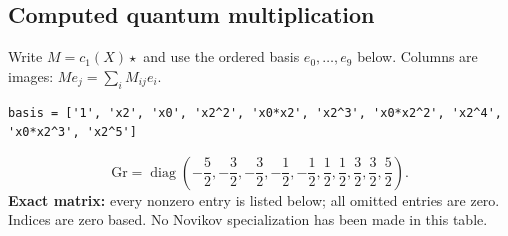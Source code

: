 \documentclass[10pt,a4paper]{article}
\begin{document}
\subsection*{Computed quantum multiplication}
Write $M=c_1(X)\star$ and use the ordered basis $e_0,\ldots,e_{9}$ below. Columns are images: $M e_j=\sum_i M_{ij}e_i$.
\begin{lstlisting}
basis = ['1', 'x2', 'x0', 'x2^2', 'x0*x2', 'x2^3', 'x0*x2^2', 'x2^4', 'x0*x2^3', 'x2^5']
\end{lstlisting}
\[\mathrm{Gr}=\operatorname{diag}\!\left(- \frac{5}{2},- \frac{3}{2},- \frac{3}{2},- \frac{1}{2},- \frac{1}{2},\frac{1}{2},\frac{1}{2},\frac{3}{2},\frac{3}{2},\frac{5}{2}\right).\]
\textbf{Exact matrix:} every nonzero entry is listed below; all omitted entries are zero. Indices are zero based. No Novikov specialization has been made in this table.
\end{document}
